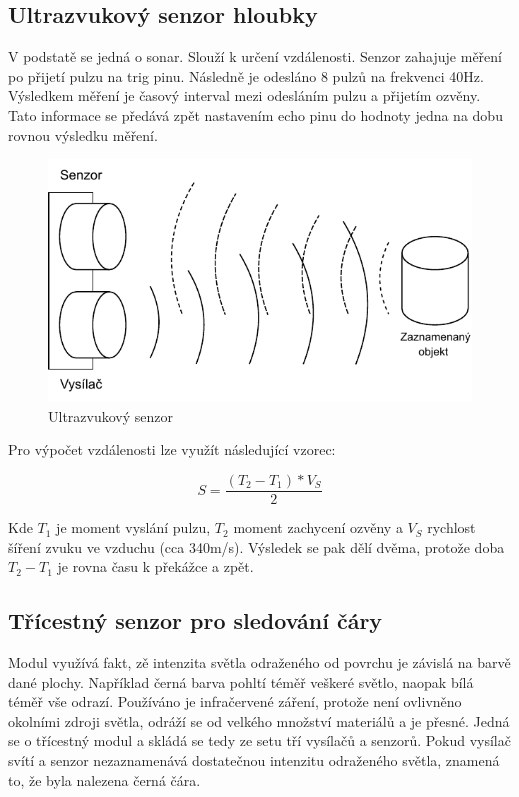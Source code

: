 \subsection*{Ultrazvukový senzor hloubky} \label{theory:ultrasonic}
V podstatě se jedná o sonar. Slouží k určení vzdálenosti. Senzor zahajuje měření po přijetí pulzu na trig pinu. Následně je odesláno 8 pulzů na frekvenci 40Hz. Výsledkem měření je časový interval mezi odesláním pulzu a přijetím ozvěny. Tato informace se předává zpět nastavením echo pinu do hodnoty jedna na dobu rovnou výsledku měření. \cite[str:~93]{embeded_robotics}

\begin{figure}[h!]
	\centering
	\includegraphics[scale=0.75]{obrazky-figures/ultrasonic.pdf}
	\caption{Ultrazvukový senzor}
	\label{}
\end{figure}

Pro výpočet vzdálenosti lze využít následující vzorec:

$$S = \frac{(T_2 - T_1) * V_S}{2}$$

Kde $T_1$ je moment vyslání pulzu, $T_2$ moment zachycení ozvěny a $V_S$ rychlost šíření zvuku ve vzduchu (cca 340m/s). Výsledek se pak dělí dvěma, protože doba $T_2 - T_1$ je rovna času k překážce a zpět.

\subsection*{Třícestný senzor pro sledování čáry}
Modul využívá fakt, zě intenzita světla odraženého od povrchu je závislá na barvě dané plochy. Například černá barva pohltí téměř veškeré světlo, naopak bílá téměř vše odrazí. Používáno je infračervené záření, protože není ovlivněno okolními zdroji světla, odráží se od velkého množství materiálů a je přesné. Jedná se o třícestný modul a skládá se tedy ze setu tří vysílačů a senzorů. Pokud vysílač svítí a senzor nezaznamenává dostatečnou intenzitu odraženého světla, znamená to, že byla nalezena černá čára. \cite{embeded_robotics}


